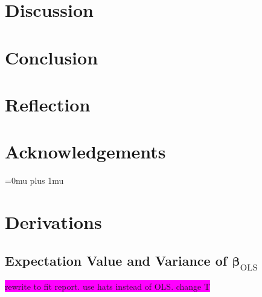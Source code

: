 \documentclass[aps,pra,english,notitlepage,reprint,nofootinbib]{revtex4-1}  %
\begin{document}
\section{Discussion}\label{sec:discussion}


\section{Conclusion}\label{sec:conclusion}


\section{Reflection}\label{sec:reflection}

\section*{Acknowledgements}\label{sec:cknowledgements}

\Urlmuskip=0mu plus 1mu\relax
\onecolumngrid


\newpage
\appendix
\section{Derivations}\label{appsec:derivations}
\subsection{Expectation Value and Variance of \texorpdfstring{$\boldsymbol{\beta}_\text{OLS}$}{Lg}}\label{subapp:beta OLS}
\colorbox{magenta}{rewrite to fit report. use hats instead of OLS. change T}
\end{document}
